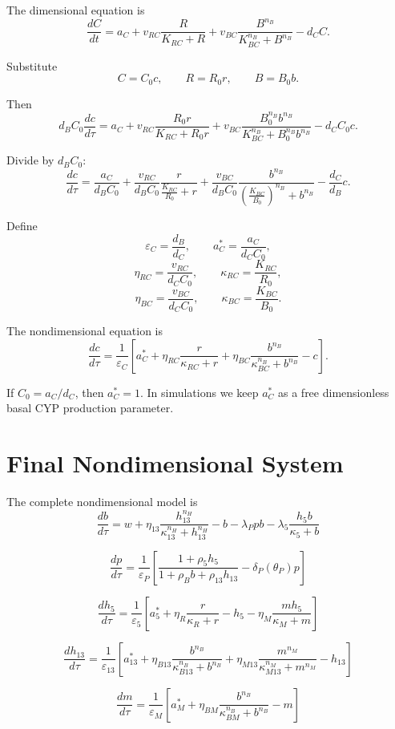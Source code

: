 \documentclass[11pt]{article}
\begin{document}
The dimensional equation is
\[
\frac{dC}{dt}
=
a_C
+
v_{RC}\frac{R}{K_{RC}+R}
+
v_{BC}
\frac{B^{n_B}}
{K_{BC}^{n_B}+B^{n_B}}
-
d_CC.
\]

Substitute
\[
C=C_0c,\qquad R=R_0r,\qquad B=B_0b.
\]

Then
\[
d_BC_0\frac{dc}{d\tau}
=
a_C
+
v_{RC}\frac{R_0r}{K_{RC}+R_0r}
+
v_{BC}
\frac{B_0^{n_B}b^{n_B}}
{K_{BC}^{n_B}+B_0^{n_B}b^{n_B}}
-
d_CC_0c.
\]

Divide by \(d_BC_0\):
\[
\frac{dc}{d\tau}
=
\frac{a_C}{d_BC_0}
+
\frac{v_{RC}}{d_BC_0}
\frac{r}{\frac{K_{RC}}{R_0}+r}
+
\frac{v_{BC}}{d_BC_0}
\frac{b^{n_B}}
{\left(\frac{K_{BC}}{B_0}\right)^{n_B}+b^{n_B}}
-
\frac{d_C}{d_B}c.
\]

Define
\[
\varepsilon_C=\frac{d_B}{d_C},
\qquad
a_C^*=\frac{a_C}{d_CC_0},
\]
\[
\eta_{RC}=\frac{v_{RC}}{d_CC_0},
\qquad
\kappa_{RC}=\frac{K_{RC}}{R_0},
\]
\[
\eta_{BC}=\frac{v_{BC}}{d_CC_0},
\qquad
\kappa_{BC}=\frac{K_{BC}}{B_0}.
\]

The nondimensional equation is
\[
\boxed{
\frac{dc}{d\tau}
=
\frac{1}{\varepsilon_C}
\left[
a_C^*
+
\eta_{RC}\frac{r}{\kappa_{RC}+r}
+
\eta_{BC}
\frac{b^{n_B}}
{\kappa_{BC}^{n_B}+b^{n_B}}
-
c
\right].
}
\]

If \(C_0=a_C/d_C\), then \(a_C^*=1\). In simulations we keep \(a_C^*\) as a free dimensionless basal CYP production parameter.

\section{Final Nondimensional System}

The complete nondimensional model is
\[
\boxed{
\frac{db}{d\tau}
=
w
+
\eta_{13}
\frac{h_{13}^{n_H}}
{\kappa_{13}^{n_H}+h_{13}^{n_H}}
-
b
-
\lambda_Ppb
-
\lambda_5\frac{h_5b}{\kappa_5+b}
}
\]

\[
\boxed{
\frac{dp}{d\tau}
=
\frac{1}{\varepsilon_P}
\left[
\frac{1+\rho_5h_5}
{1+\rho_Bb+\rho_{13}h_{13}}
-
\delta_P(\theta_P)p
\right]
}
\]

\[
\boxed{
\frac{dh_5}{d\tau}
=
\frac{1}{\varepsilon_5}
\left[
a_5^*
+
\eta_R\frac{r}{\kappa_R+r}
-
h_5
-
\eta_M\frac{mh_5}{\kappa_M+m}
\right]
}
\]

\[
\boxed{
\frac{dh_{13}}{d\tau}
=
\frac{1}{\varepsilon_{13}}
\left[
a_{13}^*
+
\eta_{B13}
\frac{b^{n_B}}
{\kappa_{B13}^{n_B}+b^{n_B}}
+
\eta_{M13}
\frac{m^{n_M}}
{\kappa_{M13}^{n_M}+m^{n_M}}
-
h_{13}
\right]
}
\]

\[
\boxed{
\frac{dm}{d\tau}
=
\frac{1}{\varepsilon_M}
\left[
a_M^*
+
\eta_{BM}
\frac{b^{n_B}}
{\kappa_{BM}^{n_B}+b^{n_B}}
-
m
\right]
}
\]
\end{document}

